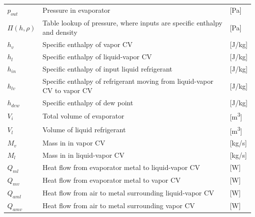 \begin{center}
	\begin{tabular}{l p{10cm} l}
		$ p_{out} 	$     & Pressure in evaporator                                                  & [\si{Pa}]                         \\
		$\Pi(h,\rho) $   & Table lookup of pressure, where inputs are specific enthalpy and density & [\si{Pa}]                         \\
		$h_{v} $         & Specific enthalpy of vapor CV                                            & [\si{J}/\si{kg}]                  \\
		$h_{l} $         & Specific enthalpy of liquid-vapor CV                                     & [\si{J}/\si{kg}]                  \\
		$h_{in} $        & Specific enthalpy of input liquid refrigerant                            & [\si{J}/\si{kg}]                  \\
		$h_{lv} $        & Specific enthalpy of refrigerant moving from liquid-vapor CV to vapor CV & [\si{J}/\si{kg}]                  \\
		$h_{dew}$        & Specific enthalpy of dew point                                           & [\si{J}/\si{kg}]                  \\
		$V_{i} $         & Total volume of evaporator                                               & [\si{m^3}]                        \\
		$V_{l} $         & Volume of liquid refrigerant                                             & [\si{m^3}]                        \\
		$M_{v}$          & Mass in	in vapor CV                                                     & [\si{kg}/\si{s}]                  \\
		$M_{l}$          & Mass in	in liquid-vapor CV                                              & [\si{kg}/\si{s}]                  \\
		$Q_{ml}$         & Heat flow from evaporator metal to liquid-vapor CV                       & [\si{W}]                          \\
		$Q_{mv}$         & Heat flow from evaporator metal to vapor CV                              & [\si{W}]                          \\
		$Q_{aml}$        & Heat flow from air to metal surrounding liquid-vapor CV                  & [\si{W}]                          \\
		$Q_{amv}$        & Heat flow from air to metal surrounding vapor CV                         & [\si{W}]                          \\

\end{tabular}
\end{center}
